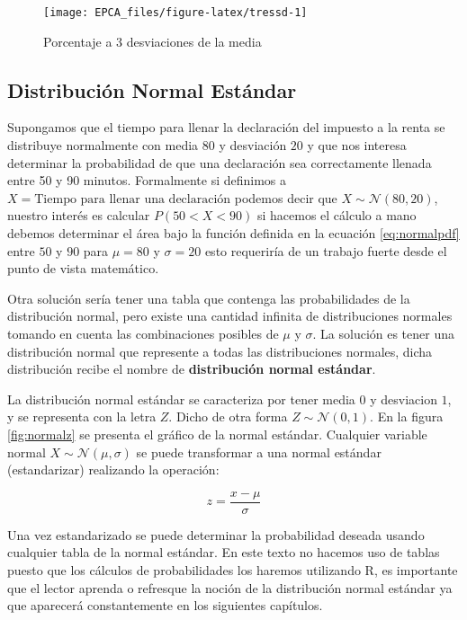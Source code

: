 \documentclass[letterpaper,]{book}
\begin{document}
\begin{figure}[h!]

{\centering \texttt{[image: EPCA\_files/figure-latex/tressd-1]} 

}

\caption{Porcentaje a 3 desviaciones de la media}\label{fig:tressd}
\end{figure}

\hypertarget{dne}{%
\subsection{Distribución Normal Estándar}\label{dne}}

Supongamos que el tiempo para llenar la declaración del impuesto a la renta se distribuye normalmente con media \(80\) y desviación \(20\) y que nos interesa determinar la probabilidad de que una declaración sea correctamente llenada entre 50 y 90 minutos. Formalmente si definimos a \(X=\text{Tiempo para llenar una declaración}\) podemos decir que \(X \sim \mathcal{N}\left(80,20\right)\), nuestro interés es calcular \(P\left(50< X <90\right)\) si hacemos el cálculo a mano debemos determinar el área bajo la función definida en la ecuación \eqref{eq:normalpdf} entre \(50\) y \(90\) para \(\mu=80\) y \(\sigma=20\) esto requeriría de un trabajo fuerte desde el punto de vista matemático.

Otra solución sería tener una tabla que contenga las probabilidades de la distribución normal, pero existe una cantidad infinita de distribuciones normales tomando en cuenta las combinaciones posibles de \(\mu\) y \(\sigma\). La solución es tener una distribución normal que represente a todas las distribuciones normales, dicha distribución recibe el nombre de \textbf{distribución normal estándar}.

La distribución normal estándar se caracteriza por tener media \(0\) y desviacion \(1\), y se representa con la letra \(Z\). Dicho de otra forma \(Z \sim \mathcal{N}\left(0,1\right)\). En la figura \ref{fig:normalz} se presenta el gráfico de la normal estándar.
Cualquier variable normal \(X\sim \mathcal{N}\left(\mu,\sigma\right)\) se puede transformar a una normal estándar (estandarizar) realizando la operación:

\begin{equation} 
z=\dfrac{x-\mu}{\sigma}
\label{eq:normalest}
\end{equation}

Una vez estandarizado se puede determinar la probabilidad deseada usando cualquier tabla de la normal estándar. En este texto no hacemos uso de tablas puesto que los cálculos de probabilidades los haremos utilizando R, es importante que el lector aprenda o refresque la noción de la distribución normal estándar ya que aparecerá constantemente en los siguientes capítulos.
\end{document}
